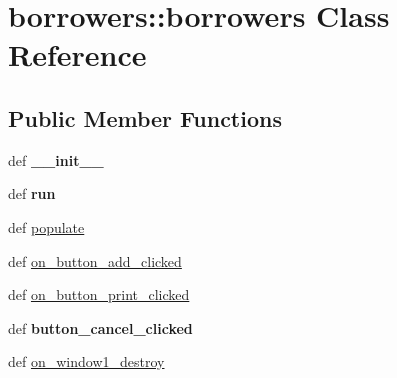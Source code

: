 \hypertarget{classborrowers_1_1borrowers}{
\section{borrowers::borrowers Class Reference}
\label{classborrowers_1_1borrowers}
}
\subsection*{Public Member Functions}
\begin{DoxyCompactItemize}
\item 
\hypertarget{classborrowers_1_1borrowers_a3479ee4f66393d9d9b3d775a57052f1e}{
def {\bfseries \_\-\_\-init\_\-\_\-}}
\label{classborrowers_1_1borrowers_a3479ee4f66393d9d9b3d775a57052f1e}

\item 
\hypertarget{classborrowers_1_1borrowers_a2e231fb4dd8fd03b6d1463d3653ccfc3}{
def {\bfseries run}}
\label{classborrowers_1_1borrowers_a2e231fb4dd8fd03b6d1463d3653ccfc3}

\item 
def \hyperlink{classborrowers_1_1borrowers_a18100648193c523f0087a413ae7aa250}{populate}
\item 
def \hyperlink{classborrowers_1_1borrowers_aabf0b5a5ebda30b6302f89fa5595f2fa}{on\_\-button\_\-add\_\-clicked}
\item 
def \hyperlink{classborrowers_1_1borrowers_a1403999a88a574126ab61d290bf3fee3}{on\_\-button\_\-print\_\-clicked}
\item 
\hypertarget{classborrowers_1_1borrowers_a5ec24faad2e348ed2df4b50a71bf8cc6}{
def {\bfseries button\_\-cancel\_\-clicked}}
\label{classborrowers_1_1borrowers_a5ec24faad2e348ed2df4b50a71bf8cc6}

\item 
def \hyperlink{classborrowers_1_1borrowers_a55ca1ad181487a703556bf252d170e26}{on\_\-window1\_\-destroy}
\end{DoxyCompactItemize}
